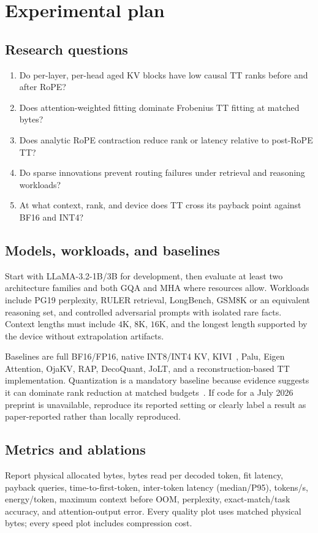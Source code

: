 \documentclass[11pt]{article}
\begin{document}
\section{Experimental plan}
\label{sec:experiments}

\subsection{Research questions}
\begin{enumerate}[leftmargin=1.55em,itemsep=2pt]
\item Do per-layer, per-head aged KV blocks have low causal TT ranks before and after RoPE?
\item Does attention-weighted fitting dominate Frobenius TT fitting at matched bytes?
\item Does analytic RoPE contraction reduce rank or latency relative to post-RoPE TT?
\item Do sparse innovations prevent routing failures under retrieval and reasoning workloads?
\item At what context, rank, and device does TT cross its payback point against BF16 and INT4?
\end{enumerate}

\subsection{Models, workloads, and baselines}
Start with LLaMA-3.2-1B/3B for development, then evaluate at least two architecture families and
both GQA and MHA where resources allow. Workloads include PG19 perplexity, RULER retrieval,
LongBench, GSM8K or an equivalent reasoning set, and controlled adversarial prompts with isolated
rare facts. Context lengths must include $4$K, $8$K, $16$K, and the longest length supported by the
device without extrapolation artifacts.

Baselines are full BF16/FP16, native INT8/INT4 KV, KIVI~\cite{kivi}, Palu, Eigen Attention,
OjaKV, RAP, DecoQuant, JoLT, and a reconstruction-based TT implementation. Quantization is a
mandatory baseline because evidence suggests it can dominate rank reduction at matched
budgets~\cite{quantdom}. If code for a July 2026 preprint is unavailable, reproduce its reported
setting or clearly label a result as paper-reported rather than locally reproduced.

\subsection{Metrics and ablations}
Report physical allocated bytes, bytes read per decoded token, fit latency, payback queries,
time-to-first-token, inter-token latency (median/P95), tokens/s, energy/token, maximum context before
OOM, perplexity, exact-match/task accuracy, and attention-output error. Every quality plot uses
matched physical bytes; every speed plot includes compression cost.
\end{document}
